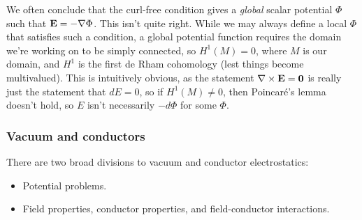 \documentclass[11pt]{article}
\begin{document}
\begin{reemark}
    [On $\curl \elec = \mathbf{0} \implies \elec = - \grad \Phi$]
    We often conclude that the curl-free condition gives a \emph{global} 
    scalar potential $\Phi$ such that $\mathbf{E} = - \nabla \Phi$. This isn't quite
    right. While we may always define a local $\Phi$ that satisfies such a
    condition, a global potential function requires the domain we're working
    on to be simply connected, so $H^1(M) = 0$, where $M$ is our domain,
    and $H^1$ is the first de Rham cohomology (lest things become multivalued). 
    This is intuitively obvious, as the statement $\nabla \times \mathbf{E} = \mathbf{0}$ is 
    really just the statement that $dE = 0$, so if $H^1(M) \neq 0$, then Poincar\'e's 
    lemma doesn't hold, so $E$ isn't necessarily $- d\Phi$ for some $\Phi$.
\end{reemark}

\subsubsection{Vacuum and conductors}

There are two broad divisions to vacuum and conductor electrostatics:
\begin{itemize}
    \item Potential problems.
    \item Field properties, conductor properties, and field-conductor interactions.
\end{itemize}
\end{document}
